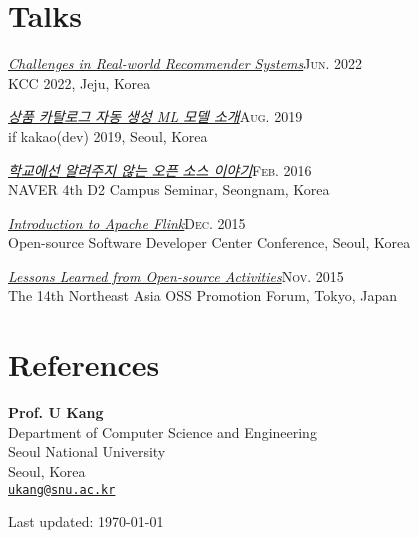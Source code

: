 \documentclass[11pt,a4paper]{article}
\renewenvironment{itemize}{
  \begin{list}{}{
    \setlength{\leftmargin}{1.5em}
    \setlength{\itemsep}{0.5em}
    \setlength{\parskip}{0pt}
    \setlength{\parsep}{0.25em}
  }
}{
  \end{list}
}
\begin{document}
\section*{Talks}
\begin{itemize}
  \item \href{https://speakerdeck.com/chiwanpark/challenges-in-real-world-recommender-systems}{\textit{Challenges in Real-world Recommender Systems}}\hfill\textsc{Jun. 2022}\\
        KCC 2022, Jeju, Korea
  \item \href{http://j.mp/chiwanpark-ifkakao2019}{\textit{상품 카탈로그 자동 생성 ML 모델 소개}}\hfill\textsc{Aug. 2019}\\
        if kakao(dev) 2019, Seoul, Korea
  \item \href{http://j.mp/d2-campus-seminar-4th-park}{\textit{학교에선 알려주지 않는 오픈 소스 이야기}}\hfill\textsc{Feb. 2016}\\
        NAVER 4th D2 Campus Seminar, Seongnam, Korea
  \item \href{http://j.mp/ossdevconf-2015-park}{\textit{Introduction to Apache Flink}}\hfill\textsc{Dec. 2015}\\
        Open-source Software Developer Center Conference, Seoul, Korea
  \item \href{http://j.mp/cjkossforum-2015-park}{\textit{Lessons Learned from Open-source Activities}}\hfill\textsc{Nov. 2015}\\
        The 14th Northeast Asia OSS Promotion Forum, Tokyo, Japan
\end{itemize}

\section*{References}
\begin{itemize}
  \item \textbf{Prof. U Kang}\\
        Department of Computer Science and Engineering\\
        Seoul National University\\
        Seoul, Korea\\
        \href{mailto:ukang@snu.ac.kr}{\texttt{ukang@snu.ac.kr}}
\end{itemize}

\bigskip
{\small Last updated: \today}
\end{document}
